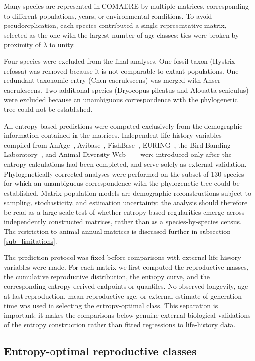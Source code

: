 \documentclass[10pt,a4paper]{amsart}
\theoremstyle{definition}
\theoremstyle{remark}
\numberwithin{equation}{section}
\begin{document}
Many species are represented in COMADRE by multiple matrices,
corresponding to different populations, years, or environmental
conditions. To avoid pseudoreplication, each species contributed a
single representative matrix, selected as the one with the largest
number of age classes; ties were broken by proximity of
$\lambda$ to unity.

Four species were excluded from the final analyses. One fossil taxon (Hystrix refossa) was removed because it is not comparable to extant populations. One redundant taxonomic entry (Chen caerulescens) was merged with Anser caerulescens. Two additional species (Dryocopus pileatus and Alouatta seniculus) were excluded because an unambiguous correspondence with the phylogenetic tree could not be established.

All entropy-based predictions were computed exclusively from the
demographic information contained in the matrices. Independent
life-history variables --- compiled from
AnAge~\cite{Tacutu2018}, Avibase~\cite{Lepage2024},
FishBase~\cite{FroesePauly2024}, EURING~\cite{EURING2024}, the Bird
Banding Laboratory~\cite{BBL2024}, and Animal Diversity
Web~\cite{ADW2024} --- were introduced only after the entropy
calculations had been completed, and serve solely as external
validation. Phylogenetically corrected analyses were performed on the
subset of 130 species for which an unambiguous correspondence with
the phylogenetic tree could be established. Matrix population models
are demographic reconstructions subject to sampling, stochasticity,
and estimation uncertainty; the analysis should therefore be read as
a large-scale test of whether entropy-based regularities emerge
across independently constructed matrices, rather than as a
species-by-species census. The restriction to animal annual
matrices is discussed further in subsection \ref{sub_limitations}.

The prediction protocol was fixed before comparisons with external life-history variables were made. For each matrix we first computed the reproductive masses, the cumulative reproductive distribution, the entropy curve, and the corresponding entropy-derived endpoints or quantiles. No observed longevity, age at last reproduction, mean reproductive age, or external estimate of generation time was used in selecting the entropy-optimal class. This separation is important: it makes the comparisons below genuine external biological validations of the entropy construction rather than fitted regressions to life-history data.

\subsection{Entropy-optimal reproductive classes}
\end{document}
